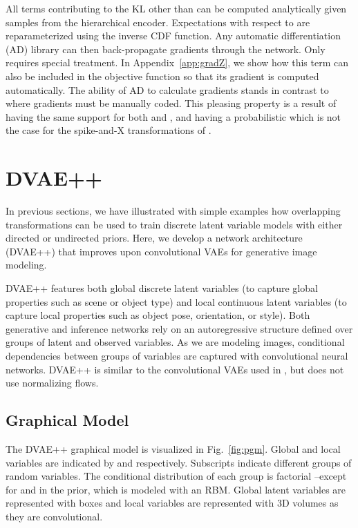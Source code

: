 \documentclass{article}
\begin{document}
All terms contributing to the KL other than  can be computed analytically given samples from the hierarchical encoder.
Expectations with respect to  are reparameterized using the inverse CDF function. Any automatic differentiation (AD) library can then back-propagate gradients through the network. Only  requires special treatment. In Appendix~\ref{app:gradZ},
we show how this term can also be included in the objective function so that its gradient is computed automatically. The ability of AD to calculate gradients stands in contrast to \cite{rolfe2016discrete} where gradients must be manually coded. This pleasing property is a result of  
having the same support for both  and , and
having a probabilistic  which is not the case for the spike-and-X transformations of  \cite{rolfe2016discrete}.

\section{DVAE++}

In previous sections, we have illustrated with simple examples how overlapping transformations can be used to train discrete latent variable models with either directed or undirected priors. Here, we develop a network architecture (DVAE++) that improves
upon convolutional VAEs for generative image modeling.

DVAE++ features both global discrete latent variables (to capture global properties such as scene or object type) and local continuous latent variables (to capture local properties 
such as object pose, orientation, or style). Both generative and inference networks rely on an autoregressive structure defined over groups of latent and observed variables. As we are modeling images, conditional dependencies between groups of variables are captured with convolutional neural networks. DVAE++ is similar to
the convolutional VAEs used in \cite{kingma2016improved, chen2016variational}, but does not use normalizing flows.

\subsection{Graphical Model}

The DVAE++ graphical model is visualized in Fig.~\ref{fig:pgm}. Global and local variables are indicated by  and  respectively. Subscripts indicate different groups of random variables. The conditional distribution of each group is factorial --except for  and  in the prior, which is modeled with an RBM. Global latent variables are represented with boxes and local variables are represented with 3D volumes as they are convolutional. 
\end{document}
